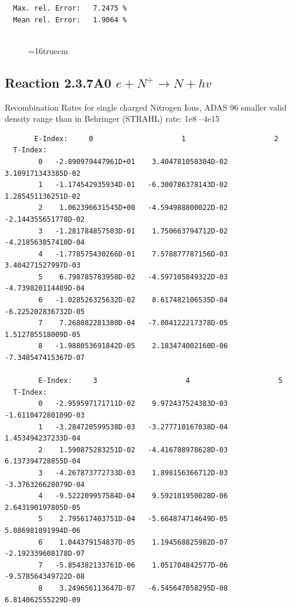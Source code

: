 \documentclass[12pt,dvipdfmx]{article}
\begin{document}
\begin{small}
\begin{verbatim}
  Max. rel. Error:   7.2475 %
  Mean rel. Error:   1.9064 %


\end{verbatim}\end{small}
\begin{figure} \label{2.3.6A0}
\epsfxsize=16truecm
\end{figure}
\newpage
\subsection{
Reaction 2.3.7A0  $e + N^{+} \rightarrow N + hv$ }
 Recombination Rates for single  charged Nitrogen Ions, ADAS 96
 smaller valid density range than in Behringer (STRAHL) rate: 1e8 --4e15

\begin{small}\begin{verbatim}
       E-Index:     0                     1                     2
  T-Index:
        0   -2.890979447961D+01    3.404781058304D-02    3.109171343385D-02
        1   -1.174542935934D-01   -6.300786378143D-02    1.285451136251D-02
        2    1.062396631545D+00   -4.594988800022D-02   -2.144355651778D-02
        3   -1.281784857503D-01    1.750663794712D-02   -4.218563857410D-04
        4   -1.778575430266D-01    7.578877787156D-03    3.404271527997D-03
        5    6.798785783958D-02   -4.597105849322D-03   -4.739820114489D-04
        6   -1.028526325632D-02    8.617482106535D-04   -6.225202836732D-05
        7    7.268082281380D-04   -7.084122217378D-05    1.512785518009D-05
        8   -1.988053691842D-05    2.183474002160D-06   -7.348547415367D-07

        E-Index:     3                     4                     5
  T-Index:
        0   -2.959597171711D-02    9.972437524383D-03   -1.611047280109D-03
        1   -3.284720599538D-03   -3.277710167038D-04    1.453494237233D-04
        2    1.590875283251D-02   -4.416788978628D-03    6.137394728855D-04
        3   -4.267873772733D-03    1.898156366712D-03   -3.376326628079D-04
        4   -9.522209957584D-04    9.592101950028D-06    2.643190197805D-05
        5    2.795617403751D-04   -5.664874714649D-05    5.086981091994D-06
        6    1.044379154837D-05    1.194568825982D-07   -2.192339608178D-07
        7   -5.854382133761D-06    1.051704842577D-06   -9.578564349722D-08
        8    3.249656113647D-07   -6.545647058295D-08    6.814062555229D-09


\end{verbatim}
\end{small}
\end{document}
